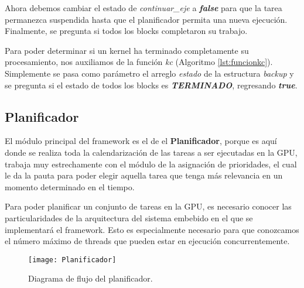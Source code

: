 Ahora debemos cambiar el estado de \textit{continuar\_eje} a \textbf{\textit{false}} para que la tarea permanezca suspendida hasta que el planificador permita una nueva ejecución. Finalmente, se pregunta si todos los blocks completaron su trabajo.



Para poder determinar si un kernel ha terminado completamente su procesamiento, nos auxiliamos de la función \textit{kc} (Algoritmo \ref{lst:funcionkc}). Simplemente se pasa como parámetro el arreglo \textit{estado} de la estructura \textit{backup} y se pregunta si el estado de todos los blocks es \textit{\textbf{TERMINADO}}, regresando \textbf{\textit{true}}.




\subsection{Planificador} \label{secc:planificador}

El módulo principal del framework es el de el \textbf{Planificador}, porque es aquí donde se realiza toda la calendarización de las tareas a ser ejecutadas en la GPU, trabaja muy estrechamente con el módulo de la asignación de prioridades, el cual le da la pauta para poder elegir aquella tarea que tenga más relevancia en un momento determinado en el tiempo. 
\newline

Para poder planificar un conjunto de tareas en la GPU, es necesario conocer las particularidades de la arquitectura del sistema embebido en el que se implementará el framework. Esto es especialmente necesario para que conozcamos el número máximo de threads que pueden estar en ejecución concurrentemente.
\newline

    \begin{figure}[ht]
      \centering
        \texttt{[image: Planificador]}
        \caption{Diagrama de flujo del planificador.}
        \label{fig:Planificador}
    \end{figure}

